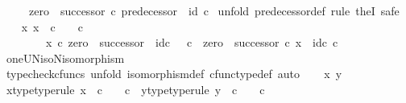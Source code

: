 \begin{isabellebody}
\ \ \ \ {\isasymand}\ {\isacharparenleft}{\kern0pt}zero\ {\isasymamalg}\ successor{\isacharparenright}{\kern0pt}\ {\isasymcirc}\isactrlsub c\ predecessor\ {\isacharequal}{\kern0pt}\ id\ {\isasymnat}\isactrlsub c{\isachardoublequoteclose}\isanewline
%
\isadelimproof
%
\endisadelimproof
%
\isatagproof
{}\isamarkupfalse%
\ {\isacharparenleft}{\kern0pt}unfold\ predecessor{\isacharunderscore}{\kern0pt}def{\isacharcomma}{\kern0pt}\ rule\ theI{\isacharprime}{\kern0pt}{\isacharcomma}{\kern0pt}\ safe{\isacharparenright}{\kern0pt}\isanewline
\ \ \isamarkupfalse%
\ {\isachardoublequoteopen}{\isasymexists}x{\isachardot}{\kern0pt}\ x\ {\isacharcolon}{\kern0pt}\ {\isasymnat}\isactrlsub c\ {\isasymrightarrow}\ {\isasymone}\ {\isasymCoprod}\ {\isasymnat}\isactrlsub c\ {\isasymand}\isanewline
\ \ \ \ \ \ \ \ x\ {\isasymcirc}\isactrlsub c\ zero\ {\isasymamalg}\ successor\ {\isacharequal}{\kern0pt}\ id\isactrlsub c\ {\isacharparenleft}{\kern0pt}{\isasymone}\ {\isasymCoprod}\ {\isasymnat}\isactrlsub c{\isacharparenright}{\kern0pt}\ {\isasymand}\ zero\ {\isasymamalg}\ successor\ {\isasymcirc}\isactrlsub c\ x\ {\isacharequal}{\kern0pt}\ id\isactrlsub c\ {\isasymnat}\isactrlsub c{\isachardoublequoteclose}\isanewline
\ \ \ \ \isamarkupfalse%
\ oneUN{\isacharunderscore}{\kern0pt}iso{\isacharunderscore}{\kern0pt}N{\isacharunderscore}{\kern0pt}isomorphism\ \isamarkupfalse%
\ {\isacharparenleft}{\kern0pt}typecheck{\isacharunderscore}{\kern0pt}cfuncs{\isacharcomma}{\kern0pt}\ unfold\ isomorphism{\isacharunderscore}{\kern0pt}def\ cfunc{\isacharunderscore}{\kern0pt}type{\isacharunderscore}{\kern0pt}def{\isacharcomma}{\kern0pt}\ auto{\isacharparenright}{\kern0pt}\isanewline
{}\isamarkupfalse%
\isanewline
\ \ \isamarkupfalse%
\ x\ y\isanewline
\ \ \isamarkupfalse%
\ x{\isacharunderscore}{\kern0pt}type{\isacharbrackleft}{\kern0pt}type{\isacharunderscore}{\kern0pt}rule{\isacharbrackright}{\kern0pt}{\isacharcolon}{\kern0pt}\ {\isachardoublequoteopen}x\ {\isacharcolon}{\kern0pt}\ {\isasymnat}\isactrlsub c\ {\isasymrightarrow}\ {\isasymone}\ {\isasymCoprod}\ {\isasymnat}\isactrlsub c{\isachardoublequoteclose}\ \ y{\isacharunderscore}{\kern0pt}type{\isacharbrackleft}{\kern0pt}type{\isacharunderscore}{\kern0pt}rule{\isacharbrackright}{\kern0pt}{\isacharcolon}{\kern0pt}\ {\isachardoublequoteopen}y\ {\isacharcolon}{\kern0pt}\ {\isasymnat}\isactrlsub c\ {\isasymrightarrow}\ {\isasymone}\ {\isasymCoprod}\ {\isasymnat}\isactrlsub c{\isachardoublequoteclose}\isanewline

\end{isabellebody}
